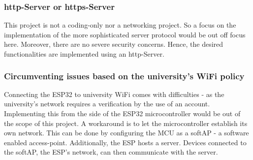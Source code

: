 \documentclass[../report.tex]{subfiles}
\begin{document}
\quad

\subsubsection{http-Server or https-Server}
This project is not a coding-only nor a networking project. So a focus on the 
implementation of the more sophisticated server protocol would
be out off focus here. Moreover, there are no severe security concerns. Hence, the desired functionalities 
are implemented using an http-Server.

\subsubsection{Circumventing issues based on the university's WiFi policy}

Connecting the ESP32 to university WiFi comes with difficulties - as the 
university's network requires a verification by the use of an account. Implementing this
from the side of the ESP32 microcontroller would be out of the scope of this project.
A workaround is to let the microcontroller establish its own network. This can be 
done by configuring the MCU as a softAP - a software enabled access-point. 
Additionally, the ESP hosts a server. Devices connected to the softAP, the ESP's network, can then 
communicate with the server.
\end{document}
